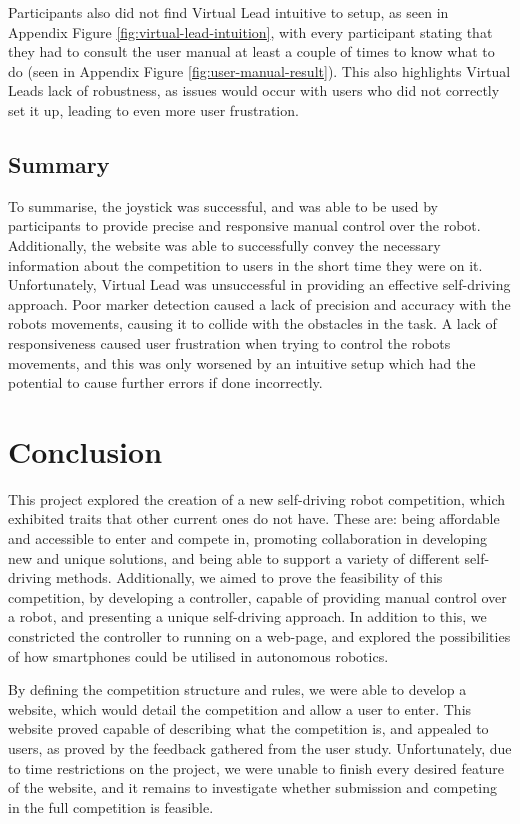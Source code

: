 \documentclass{l4proj}
\begin{document}
Participants also did not find Virtual Lead intuitive to setup, as seen in Appendix Figure \ref{fig:virtual-lead-intuition}, with every participant stating that they had to consult the user manual at least a couple of times to know what to do (seen in  Appendix Figure \ref{fig:user-manual-result}). This also highlights Virtual Leads lack of robustness, as issues would occur with users who did not correctly set it up, leading to even more user frustration.

\section{Summary}
To summarise, the joystick was successful, and was able to be used by participants to provide precise and responsive manual control over the robot. Additionally, the website was able to successfully convey the necessary information about the competition to users in the short time they were on it. Unfortunately, Virtual Lead was unsuccessful in providing an effective self-driving approach. Poor marker detection caused a lack of precision and accuracy with the robots movements, causing it to collide with the obstacles in the task. A lack of responsiveness caused user frustration when trying to control the robots movements, and this was only worsened by an intuitive setup which had the potential to cause further errors if done incorrectly.



\chapter{Conclusion}    
This project explored the creation of a new self-driving robot competition, which exhibited traits that other current ones do not have. These are: being affordable and accessible to enter and compete in, promoting collaboration in developing new and unique solutions, and being able to support a variety of different self-driving methods. Additionally, we aimed to prove the feasibility of this competition, by developing a controller, capable of providing manual control over a robot, and presenting a unique self-driving approach. In addition to this, we constricted the controller to running on a web-page, and explored the possibilities of how smartphones could be utilised in autonomous robotics.

By defining the competition structure and rules, we were able to develop a website, which would detail the competition and allow a user to enter. This website proved capable of describing what the competition is, and appealed to users, as proved by the feedback gathered from the user study. Unfortunately, due to time restrictions on the project, we were unable to finish every desired feature of the website, and it remains to investigate whether submission and competing in the full competition is feasible.
\end{document}
